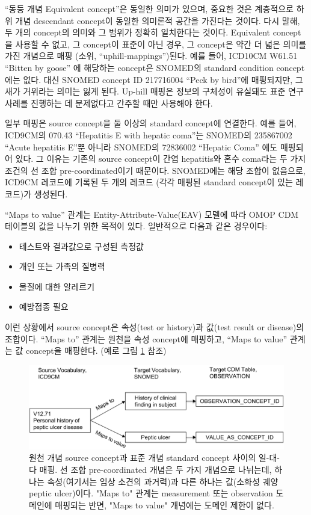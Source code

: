 \documentclass[10.5pt]{book}
\providecommand{\tightlist}{%
  \setlength{\itemsep}{0pt}\setlength{\parskip}{0pt}}
\theoremstyle{definition}
\theoremstyle{definition}
\theoremstyle{definition}
\theoremstyle{remark}
\begin{document}
``동등 개념 Equivalent concept''은 동일한 의미가 있으며, 중요한 것은
계층적으로 하위 개념 descendant concept이 동일한 의미론적 공간을
가진다는 것이다. 다시 말해, 두 개의 concept의 의미와 그 범위가 정확히
일치한다는 것이다. Equivalent concept을 사용할 수 없고, 그 concept이
표준이 아닌 경우, 그 concept은 약간 더 넓은 의미를 가진 개념으로 매핑
(소위, ``uphill-mappings'')된다. 예를 들어, ICD10CM W61.51 ``Bitten by
goose'' 에 해당하는 concept은 SNOMED의 standard condition concept에는
없다. 대신 SNOMED concept ID 217716004 ``Peck by bird''에 매핑되지만, 그
새가 거위라는 의미는 잃게 된다. Up-hill 매핑은 정보의 구체성이 유실돼도
표준 연구 사례를 진행하는 데 문제없다고 간주할 때만 사용해야 한다.

일부 매핑은 source concept을 둘 이상의 standard concept에 연결한다. 예를
들어, ICD9CM의 070.43 ``Hepatitis E with hepatic coma''는 SNOMED의
235867002 ``Acute hepatitis E''뿐 아니라 SNOMED의 72836002 ``Hepatic
Coma'' 에도 매핑되어 있다. 그 이유는 기존의 source concept이 간염
hepatitis와 혼수 coma라는 두 가지 조건의 선 조합 pre-coordinated이기
때문이다. SNOMED에는 해당 조합이 없음으로, ICD9CM 레코드에 기록된 두
개의 레코드 (각각 매핑된 standard concept이 있는 레코드)가 생성된다.

``Maps to value'' 관계는 Entity-Attribute-Value(EAV) 모델에 따라 OMOP
CDM 테이블의 값을 나누기 위한 목적이 있다. 일반적으로 다음과 같은
경우이다:

\begin{itemize}
\tightlist
\item
  테스트와 결과값으로 구성된 측정값
\item
  개인 또는 가족의 질병력
\item
  물질에 대한 알레르기
\item
  예방접종 필요
\end{itemize}

이런 상황에서 source concept은 속성(test or history)과 값(test result or
disease)의 조합이다. ``Maps to'' 관계는 원천을 속성 concept에 매핑하고,
``Maps to value'' 관계는 값 concept을 매핑한다. (예로 그림
\ref{fig:conceptValue} 참조)

\begin{figure}

{\centering \includegraphics[width=1\linewidth]{images/StandardizedVocabularies/conceptValue} 

}

\caption{원천 개념 source concept과 표준 개념 standard concept 사이의 일-대-다 매핑. 선 조합 pre-coordinated 개념은 두 가지 개념으로 나뉘는데, 하나는 속성(여기서는 임상 소견의 과거력)과 다른 하나는 값(소화성 궤양 peptic ulcer)이다. "Maps to" 관계는 measurement 또는 observation 도메인에 매핑되는 반면, "Maps to value" 개념에는 도메인 제한이 없다.}\label{fig:conceptValue}
\end{figure}
\end{document}
